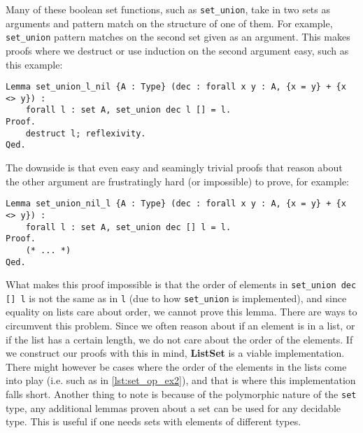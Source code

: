 Many of these boolean set functions, such as \lstinline{set_union},
take in two sets as arguments and pattern match on the structure of one of them.
For example, \lstinline{set_union} pattern matches on the second set given as an argument.
This makes proofs where we destruct or use induction on the second argument easy, such as this example:

\begin{minipage}{\linewidth}
\begin{lstlisting}[language=Coq, label={lst:set_op_ex1}, caption={Easy proof of lemma in \lstinline{ListSet}}]
Lemma set_union_l_nil {A : Type} (dec : forall x y : A, {x = y} + {x <> y}) :
    forall l : set A, set_union dec l [] = l.
Proof.
    destruct l; reflexivity.
Qed.
\end{lstlisting}
\end{minipage}

The downside is that even easy and seamingly trivial proofs that reason about the other argument are frustratingly hard
(or impossible) to prove, for example:

\begin{minipage}{\linewidth}
\begin{lstlisting}[language=Coq, label={lst:set_op_ex2}, caption={Impossible proof of lemma in \lstinline{ListSet}}]
Lemma set_union_nil_l {A : Type} (dec : forall x y : A, {x = y} + {x <> y}) :
    forall l : set A, set_union dec [] l = l.
Proof.
    (* ... *)
Qed.
\end{lstlisting}
\end{minipage}

What makes this proof impossible is that the order of elements in \lstinline{set_union dec [] l} is not the
same as in \lstinline{l} (due to how \lstinline{set_union} is implemented), and since equality on lists care about order,
we cannot prove this lemma.
There are ways to circumvent this problem.
Since we often reason about if an element is in a list, or if the list has a certain length,
we do not care about the order of the elements.
If we construct our proofs with this in mind, \textbf{ListSet} is a viable implementation.
There might however be cases where the order of the elements in the lists come into play (i.e. such as in \autoref{lst:set_op_ex2}),
and that is where this implementation falls short.
Another thing to note is because of the polymorphic nature of the \lstinline{set} type, any additional lemmas proven about a set can be
used for any decidable type. This is useful if one needs sets with elements of different types.

